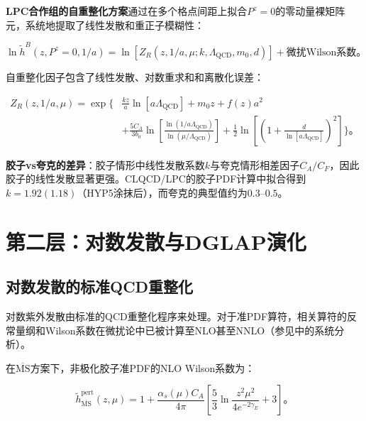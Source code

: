 \documentclass[12pt,a4paper]{ctexart}
\theoremstyle{definition}
\begin{document}
\textbf{LPC合作组的自重整化方案}\cite{Huo2021self}通过在多个格点间距上拟合$P^z=0$的零动量裸矩阵元，系统地提取了线性发散和重正子模糊性：

\begin{equation}
\ln \tilde{h}^B(z, P^z=0, 1/a) = \ln[Z_R(z, 1/a, \mu; k, \Lambda_{\text{QCD}}, m_0, d)] + \text{微扰Wilson系数}。
\label{eq:self_renorm_fit}
\end{equation}

自重整化因子包含了线性发散、对数重求和和离散化误差\cite{Chen2025gluon}：

\begin{equation}
\begin{aligned}
Z_R(z, 1/a, \mu) = \exp\Bigg\{&\frac{kz}{a}\ln[a\Lambda_{\text{QCD}}] + m_0 z + f(z)a^2 \\
&+ \frac{5C_A}{3b_0} \ln\left[\frac{\ln(1/a\Lambda_{\text{QCD}})}{\ln(\mu/\Lambda_{\text{QCD}})}\right] + \frac{1}{2}\ln\left[\left(1 + \frac{d}{\ln[a\Lambda_{\text{QCD}}]}\right)^2\right]\Bigg\}。
\end{aligned}
\label{eq:ZR_full}
\end{equation}

\textbf{胶子vs夸克的差异}\cite{Chen2025gluon}：胶子情形中线性发散系数$k$与夸克情形相差因子$C_A/C_F$，因此胶子的线性发散显著更强。CLQCD/LPC的胶子PDF计算中拟合得到$k = 1.92(1.18)$（HYP5涂抹后），而夸克的典型值约为$0.3$--$0.5$。

\section{第二层：对数发散与DGLAP演化}

\subsection{对数发散的标准QCD重整化}

对数紫外发散由标准的QCD重整化程序来处理。对于准PDF算符，相关算符的反常量纲和Wilson系数在微扰论中已被计算至NLO甚至NNLO（参见\cite{Chen2025gluon,Zhang2019,Izubuchi2018}中的系统分析）。

在$\overline{\text{MS}}$方案下，非极化胶子准PDF的NLO Wilson系数为\cite{Chen2025gluon}：

\begin{equation}
\tilde{h}^{\text{pert}}_{\overline{\text{MS}}}(z, \mu) = 1 + \frac{\alpha_s(\mu)C_A}{4\pi}\left[\frac{5}{3}\ln\frac{z^2\mu^2}{4e^{-2\gamma_E}} + 3\right]。
\label{eq:NLO_Wilson}
\end{equation}
\end{document}
